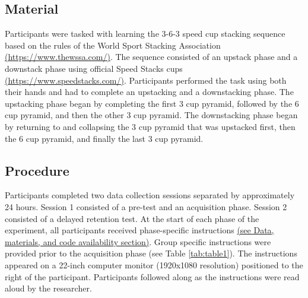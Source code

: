 \documentclass[
  english,
  man,floatsintext]{apa7}
\begin{document}
\hypertarget{material}{%
\subsection{Material}\label{material}}

Participants were tasked with learning the 3-6-3 speed cup stacking sequence based on the rules of the World Sport Stacking Association \href{https://www.thewssa.com/}{(https://www.thewssa.com/)}. The sequence consisted of an upstack phase and a downstack phase using official Speed Stacks cups \href{https://www.speedstacks.com/}{(https://www.speedstacks.com/)}. Participants performed the task using both their hands and had to complete an upstacking and a downstacking phase. The upstacking phase began by completing the first 3 cup pyramid, followed by the 6 cup pyramid, and then the other 3 cup pyramid. The downstacking phase began by returning to and collapsing the 3 cup pyramid that was upstacked first, then the 6 cup pyramid, and finally the last 3 cup pyramid.

\hypertarget{procedure}{%
\subsection{Procedure}\label{procedure}}

Participants completed two data collection sessions separated by approximately 24 hours. Session 1 consisted of a pre-test and an acquisition phase. Session 2 consisted of a delayed retention test. At the start of each phase of the experiment, all participants received phase-specific instructions \hyperref[sec:sharing]{(see Data, materials, and code availability section)}. Group specific instructions were provided prior to the acquisition phase (see Table \ref{tab:table1}). The instructions appeared on a 22-inch computer monitor (1920x1080 resolution) positioned to the right of the participant. Participants followed along as the instructions were read aloud by the researcher. \medskip
\end{document}
